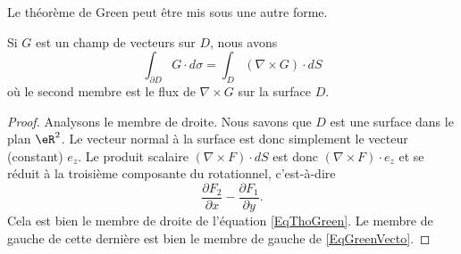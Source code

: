 Le théorème de Green peut être mis sous une autre forme.

\begin{theorem}       \label{ThoGreenVecto}
	Si \( G\) est un champ de vecteurs sur \( D\), nous avons
	\begin{equation}        \label{EqGreenVecto}
		\int_{\partial D}G\cdot d\sigma=\int_D(\nabla\times G)\cdot dS
	\end{equation}
	où le second membre est le flux de \( \nabla\times G\) sur la surface \( D\).
\end{theorem}

\begin{proof}
	Analysons le membre de droite. Nous savons que \( D\) est une surface dans le plan \( \eR^2\). Le vecteur normal à la surface est donc simplement le vecteur (constant) \( e_z\). Le produit scalaire \( (\nabla\times F)\cdot dS\) est donc \( (\nabla\times F)\cdot e_z\) et se réduit à la troisième composante du rotationnel, c'est-à-dire
	\begin{equation}
		\frac{ \partial F_2 }{ \partial x }-\frac{ \partial F_1 }{ \partial y }.
	\end{equation}
	Cela est bien le membre de droite de l'équation \eqref{EqThoGreen}. Le membre de gauche de cette dernière est bien le membre de gauche de \eqref{EqGreenVecto}.
\end{proof}

